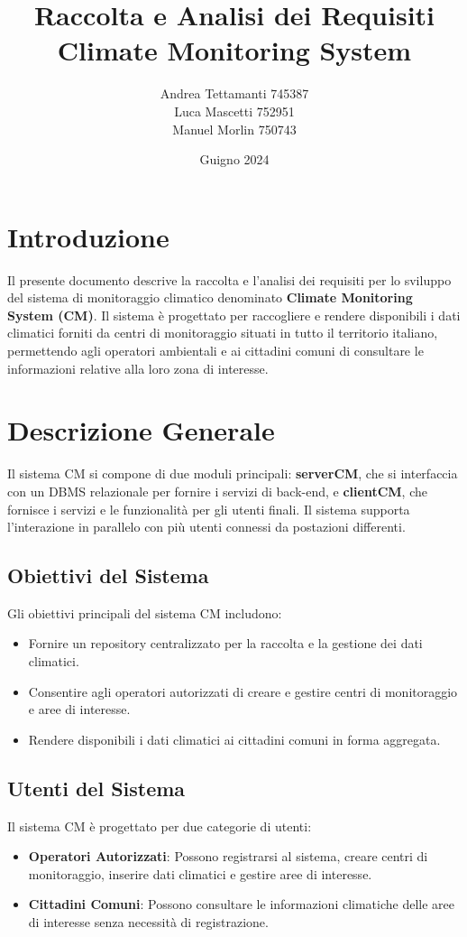 \documentclass[a4paper,12pt]{article}
\title{Raccolta e Analisi dei Requisiti\\ \textbf{Climate Monitoring System}}
\author{Andrea Tettamanti 745387\\
Luca Mascetti 752951\\
Manuel Morlin 750743}
\date{Guigno 2024}
\begin{document}
\maketitle
\tableofcontents
\newpage

\section{Introduzione}
Il presente documento descrive la raccolta e l'analisi dei requisiti per lo sviluppo del sistema di monitoraggio climatico denominato \textbf{Climate Monitoring System (CM)}. Il sistema è progettato per raccogliere e rendere disponibili i dati climatici forniti da centri di monitoraggio situati in tutto il territorio italiano, permettendo agli operatori ambientali e ai cittadini comuni di consultare le informazioni relative alla loro zona di interesse.

\section{Descrizione Generale}
Il sistema CM si compone di due moduli principali: \textbf{serverCM}, che si interfaccia con un DBMS relazionale per fornire i servizi di back-end, e \textbf{clientCM}, che fornisce i servizi e le funzionalità per gli utenti finali. Il sistema supporta l'interazione in parallelo con più utenti connessi da postazioni differenti.

\subsection{Obiettivi del Sistema}
Gli obiettivi principali del sistema CM includono:
\begin{itemize}
    \item Fornire un repository centralizzato per la raccolta e la gestione dei dati climatici.
    \item Consentire agli operatori autorizzati di creare e gestire centri di monitoraggio e aree di interesse.
    \item Rendere disponibili i dati climatici ai cittadini comuni in forma aggregata.
\end{itemize}

\subsection{Utenti del Sistema}
Il sistema CM è progettato per due categorie di utenti:
\begin{itemize}
    \item \textbf{Operatori Autorizzati}: Possono registrarsi al sistema, creare centri di monitoraggio, inserire dati climatici e gestire aree di interesse.
    \item \textbf{Cittadini Comuni}: Possono consultare le informazioni climatiche delle aree di interesse senza necessità di registrazione.
\end{itemize}
\end{document}
